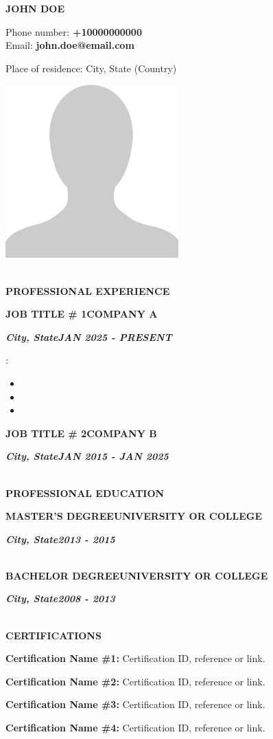 \documentclass[letterpaper,11pt]{article}
\makeatletter
\def\fullName{John Doe}
\def\email{john.doe@email.com}
\newcommand{\myName}
{
    \textbf{\LARGE \MakeUppercase{\fullName}}\par
}
\newcommand{\phoneNumber}[1]
{
    Phone number: \textbf{#1}\\
}
\newcommand{\emailField}
{
    Email: \textbf{\email}\\\par
}
\newcommand{\residence}[3]
{
    Place of residence: #1, #2 (#3)
}
\newcommand{\ressection}[4]{
    \vspace{12pt}
	\MakeUppercase{{\large\bfseries #1\hfill #2}}\par 
	\vspace{-4pt}
	\textit{{\footnotesize\bfseries #3\hfill\MakeUppercase{#4}}}\par
	\vspace{6pt}
}
\makeatother
\begin{document}
\begin{minipage}{0.7\textwidth}
    \myName{}
    \phoneNumber{+10000000000}
    \emailField{}
    \residence{City}{State}{Country}
\end{minipage}
\begin{minipage}{0.3\textwidth}
	\hfill\includegraphics[width=0.5\textwidth]{profilePicture.png}
\end{minipage}


\phantom{.}\\
\textbf{{\Large {\MakeUppercase{Professional Experience}}}}\par

\ressection{Job title \# 1}{Company A}{City, State}{Jan 2025 - Present}
\lipsum[1]\par %
\lipsum[2][1]:
\begin{itemize}
    \item \lipsum[2][2]
    \item \lipsum[2][3]
    \item \lipsum[2][4]
\end{itemize}

\ressection{Job title \# 2}{Company B}{City, State}{JAN 2015 - jAn 2025}
\lipsum[4][1-10]\par
\lipsum[5]\\

\textbf{{\Large {\MakeUppercase{Professional Education}}}}\par
\ressection{Master's Degree}{University or College}{City, State}{2013 - 2015}
\lipsum[6]\\

\ressection{Bachelor Degree}{University or College}{City, State}{2008 - 2013}
\lipsum[7]\\


\textbf{{\Large {\MakeUppercase{certifications}}}}\\\par
\textbf{Certification Name \#1:} Certification ID, reference or link.\par
\textbf{Certification Name \#2:} Certification ID, reference or link.\par
\textbf{Certification Name \#3:} Certification ID, reference or link.\par
\textbf{Certification Name \#4:} Certification ID, reference or link.\\
\end{document}
